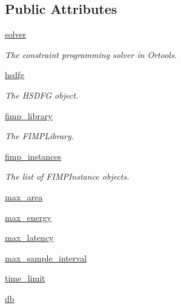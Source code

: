 \subsection*{Public Attributes}
\begin{DoxyCompactItemize}
\item 
\hyperlink{classsylva_1_1dse_1_1dse__engine_1_1_d_s_e_engine_ae88035d526d912396088ead223f5a553}{solver}
\begin{DoxyCompactList}\small\item\em The constraint programming solver in Ortools. \end{DoxyCompactList}\item 
\hyperlink{classsylva_1_1dse_1_1dse__engine_1_1_d_s_e_engine_a932dc6f4a972c0189991f9d2ce842b5b}{hsdfg}
\begin{DoxyCompactList}\small\item\em The H\+S\+D\+FG object. \end{DoxyCompactList}\item 
\hyperlink{classsylva_1_1dse_1_1dse__engine_1_1_d_s_e_engine_a50e3da63a9a4f7e4abb5ec09db297f88}{fimp\+\_\+library}
\begin{DoxyCompactList}\small\item\em The F\+I\+M\+P\+Library. \end{DoxyCompactList}\item 
\hyperlink{classsylva_1_1dse_1_1dse__engine_1_1_d_s_e_engine_a99bcef7fbd55b0058ca934b0b3f8cb4c}{fimp\+\_\+instances}
\begin{DoxyCompactList}\small\item\em The list of F\+I\+M\+P\+Instance objects. \end{DoxyCompactList}\item 
\hyperlink{classsylva_1_1dse_1_1dse__engine_1_1_d_s_e_engine_a3f8ec6d09b038af4fc1849d52945a618}{max\+\_\+area}
\item 
\hyperlink{classsylva_1_1dse_1_1dse__engine_1_1_d_s_e_engine_adc5adfdd271441b2d148ba4917a3a816}{max\+\_\+energy}
\item 
\hyperlink{classsylva_1_1dse_1_1dse__engine_1_1_d_s_e_engine_a9e3a420120dac809f071796af12ccab5}{max\+\_\+latency}
\item 
\hyperlink{classsylva_1_1dse_1_1dse__engine_1_1_d_s_e_engine_a8c3fe415b947865ef59fd5113031aa74}{max\+\_\+sample\+\_\+interval}
\item 
\hyperlink{classsylva_1_1dse_1_1dse__engine_1_1_d_s_e_engine_a1520ce483781f1abea8275fb75bbc742}{time\+\_\+limit}
\item 
\hyperlink{classsylva_1_1dse_1_1dse__engine_1_1_d_s_e_engine_a1cf7c2d64fd5e943afa03c073b9db70d}{db}

\end{DoxyCompactItemize}
